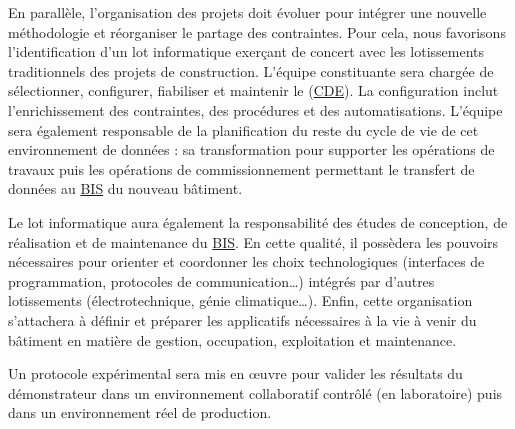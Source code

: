 \documentclass[a4paper,12pt]{article}
\begin{document}
En parallèle, l’organisation des projets doit évoluer pour intégrer une nouvelle méthodologie et réorganiser le partage des contraintes. Pour cela, nous favorisons l’identification d’un lot informatique exerçant de concert avec les lotissements traditionnels des projets de construction. L’équipe constituante sera chargée de sélectionner, configurer, fiabiliser et maintenir le  (\protect\hyperlink{gls-17}{\label{gls-17-use-1}CDE}). La configuration inclut l’enrichissement des contraintes, des procédures et des automatisations. L’équipe sera également responsable de la planification du reste du cycle de vie de cet environnement de données : sa transformation pour supporter les opérations de travaux puis les opérations de commissionnement permettant le transfert de données au \protect\hyperlink{gls-4}{\label{gls-4-use-3}BIS} du nouveau bâtiment. 

Le lot informatique aura également la responsabilité des études de conception, de réalisation et de maintenance du \protect\hyperlink{gls-4}{\label{gls-4-use-4}BIS}. En cette qualité, il possèdera les pouvoirs nécessaires pour orienter et coordonner les choix technologiques (interfaces de programmation, protocoles de communication…) intégrés par d’autres lotissements (électrotechnique, génie climatique…). Enfin, cette organisation s’attachera à définir et préparer les applicatifs nécessaires à la vie à venir du bâtiment en matière de gestion, occupation, exploitation et maintenance. 

Un protocole expérimental sera mis en œuvre pour valider les résultats du démonstrateur dans un environnement collaboratif contrôlé (en laboratoire) puis dans un environnement réel de production.
\end{document}
